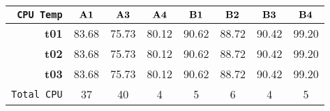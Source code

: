 \begin{tabular}{r|ccccccc}\cline{2-8}
\tt CPU Temp&$\bf A1$&$\bf A3$&$\bf A4$&$\bf B1$&$\bf B2$&$\bf B3$&$\bf B4$\\\hline
\bf t01& 83.68& 75.73& 80.12& 90.62& 88.72& 90.42& 99.20\\
\bf t02& 83.68& 75.73& 80.12& 90.62& 88.72& 90.42& 99.20\\
\bf t03& 83.68& 75.73& 80.12& 90.62& 88.72& 90.42& 99.20\\
\hline
\tt Total CPU& 37& 40& 4& 5& 6& 4& 5\\
\end{tabular}
